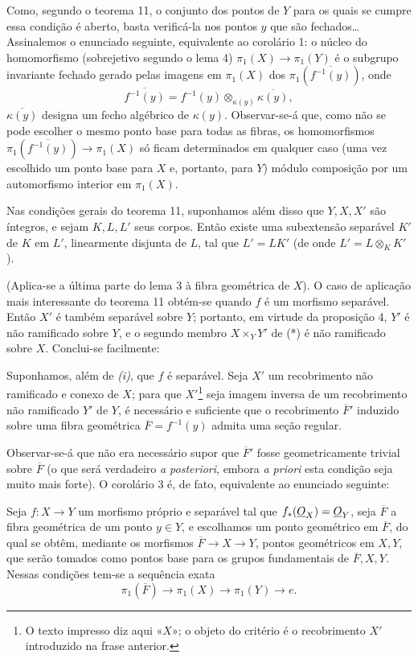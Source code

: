 Como, segundo o teorema 11, o conjunto dos pontos de $Y$ para os quais se
cumpre essa condição é aberto, basta verificá-la nos pontos $y$ que são
fechados\ldots{} Assinalemos o enunciado seguinte, equivalente ao corolário 1:
o núcleo do homomorfismo (sobrejetivo segundo o lema 4)
$\pi_1(X)\longrightarrow\pi_1(Y)$ é o subgrupo invariante fechado gerado
pelas imagens em $\pi_1(X)$ dos $\pi_1(\overline{f^{-1}(y)})$, onde
\[
  \overline{f^{-1}(y)}
  =f^{-1}(y)\otimes_{\kappa(y)}\overline{\kappa(y)},
\]
$\overline{\kappa(y)}$ designa um fecho algébrico de $\kappa(y)$. Observar-se-á
que, como não se pode escolher o mesmo ponto base para todas as fibras,
os homomorfismos $\pi_1(\overline{f^{-1}(y)})\longrightarrow\pi_1(X)$ só
ficam determinados em qualquer caso (uma vez escolhido um ponto base para $X$
e, portanto, para $Y$) módulo composição por um automorfismo interior em
$\pi_1(X)$.

 Nas condições gerais do teorema 11, suponhamos
além disso que $Y,X,X'$ são íntegros, e sejam $K,L,L'$ seus corpos. Então existe
uma subextensão separável $K'$ de $K$ em $L'$, linearmente disjunta de $L$, tal
que $L'=LK'$ (de onde $L'=L\otimes_K K'$).

(Aplica-se a última parte do lema 3 à fibra geométrica de $X$). O caso de
aplicação mais interessante do teorema 11 obtém-se quando $f$ é um morfismo
separável. Então $X'$ é também separável sobre $Y$; portanto, em virtude
da proposição 4, $Y'$ é não ramificado sobre $Y$, e o segundo membro
$X\times_Y Y'$ de (*) é não ramificado sobre $X$. Conclui-se facilmente:

 Suponhamos, além de \textit{(i)}, que $f$ é separável.
Seja $X'$ um recobrimento não ramificado e conexo de $X$; para que
$X'$\footnote{O texto impresso diz aqui «$X$»; o objeto do critério é o
recobrimento $X'$ introduzido na frase anterior.} seja imagem inversa de um
recobrimento não ramificado $Y'$ de $Y$, é necessário e suficiente que o
recobrimento $\overline F'$ induzido sobre uma fibra geométrica
$\overline F=f^{-1}(y)$ admita uma seção regular.

Observar-se-á que não era necessário supor que $\overline F'$ fosse
geometricamente trivial sobre $\overline F$ (o que será verdadeiro \textit{a
posteriori}, embora \textit{a priori} esta condição seja muito mais forte). O
corolário 3 é, de fato, equivalente ao enunciado seguinte:

 Seja $f:X\longrightarrow Y$ um morfismo próprio e separável
tal que $f_*(\underline{O}_X)=\underline{O}_Y$, seja $\overline F$ a fibra geométrica de um ponto
$y\in Y$, e escolhamos um ponto geométrico em $\overline F$, do qual se obtêm,
mediante os morfismos $\overline F\longrightarrow X\longrightarrow Y$, pontos
geométricos em $X,Y$, que serão tomados como pontos base para os grupos
fundamentais de $\overline F,X,Y$. Nessas condições tem-se a sequência
exata
\[
  \boxed{
    \pi_1(\overline F)\longrightarrow\pi_1(X)
    \longrightarrow\pi_1(Y)\longrightarrow e
  }.
\]

